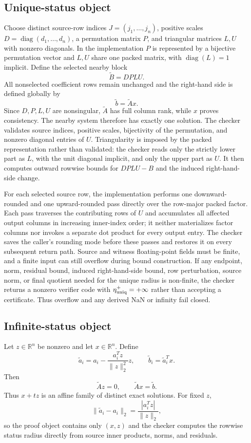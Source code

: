 \documentclass[11pt]{article}
\theoremstyle{definition}
\newcommand{\R}{\mathbb{R}}
\begin{document}
\subsection{Unique-status object}
Choose distinct source-row indices $J=(j_1,\ldots,j_n)$, positive scales $D=\operatorname{diag}(d_1,\ldots,d_n)$, a permutation matrix $P$, and triangular matrices $L,U$ with nonzero diagonals. In the implementation $P$ is represented by a bijective permutation vector and $L,U$ share one packed matrix, with $\operatorname{diag}(L)=1$ implicit. Define the selected nearby block
\[
\widetilde B=DPLU.
\]
All nonselected coefficient rows remain unchanged and the right-hand side is defined globally by
\[
\widetilde b=\widetilde A x.
\]
Since $D,P,L,U$ are nonsingular, $\widetilde A$ has full column rank, while $x$ proves consistency. The nearby system therefore has exactly one solution. The checker validates source indices, positive scales, bijectivity of the permutation, and nonzero diagonal entries of $U$. Triangularity is imposed by the packed representation rather than validated: the checker reads only the strictly lower part as $L$, with the unit diagonal implicit, and only the upper part as $U$. It then computes outward rowwise bounds for $DPLU-B$ and the induced right-hand-side change.

For each selected source row, the implementation performs one downward-rounded and one upward-rounded pass directly over the row-major packed factor. Each pass traverses the contributing rows of $U$ and accumulates all affected output columns in increasing inner-index order; it neither materializes factor columns nor invokes a separate dot product for every output entry. The checker saves the caller's rounding mode before these passes and restores it on every subsequent return path. Source and witness floating-point fields must be finite, and a finite input can still overflow during bound construction. If any endpoint, norm, residual bound, induced right-hand-side bound, row perturbation, source norm, or final quotient needed for the unique radius is non-finite, the checker returns a nonzero verifier code with $\eta_{\rm uniq}^+=+\infty$ rather than accepting a certificate. Thus overflow and any derived NaN or infinity fail closed.

\subsection{Infinite-status object}
Let $z\in\R^n$ be nonzero and let $x\in\R^n$. Define
\[
\widetilde a_i=a_i-\frac{a_i^Tz}{\|z\|_2^2}z,
\qquad
\widetilde b_i=\widetilde a_i^Tx.
\]
Then
\[
\widetilde A z=0,
\qquad
\widetilde A x=\widetilde b.
\]
Thus $x+t z$ is an affine family of distinct exact solutions. For fixed $z$,
\[
\|\widetilde a_i-a_i\|_2=\frac{|a_i^Tz|}{\|z\|_2},
\]
so the proof object contains only $(x,z)$ and the checker computes the rowwise status radius directly from source inner products, norms, and residuals.
\end{document}
